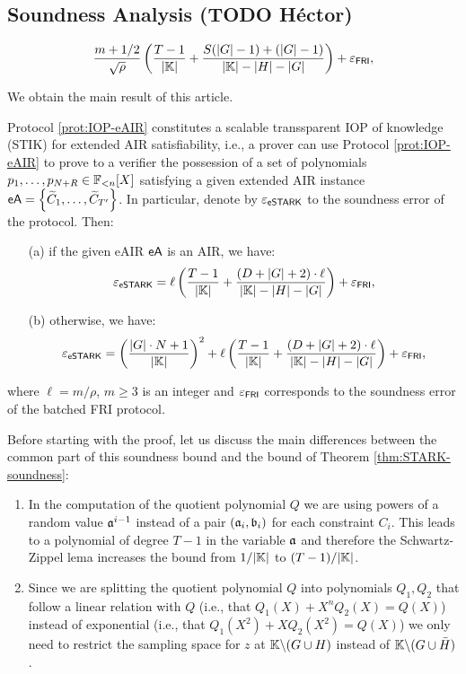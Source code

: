\ifSOUNDNESS
\subsection{Soundness Analysis (TODO Héctor)}


\[
  \frac{m+1/2}{\sqrt{\rho}} \left(\frac{T-1}{|\mathbb{K}|} + \frac{S(|G|-1)+(|G|-1)}{|\mathbb{K}|-|H|-|G|}\right) + \varepsilon_{\textsf{FRI}},
\]

We obtain the main result of this article.
\begin{theorem}\label{thm:STIK}
  Protocol \ref{prot:IOP-eAIR} constitutes a scalable transsparent IOP of knowledge (STIK) for extended AIR satisfiability, i.e., a prover can use Protocol \ref{prot:IOP-eAIR} to prove to a verifier the possession of a set of polynomials $p_1,\dots,p_{N+R} \in \mathbb{F}_{<n}[X]$ satisfying a given extended AIR instance $\textsf{eA} = \left\{\widetilde{C}_1,\dots,\widetilde{C}_{T'}\right\}$. In particular, denote by $\varepsilon_{\textsf{eSTARK}}$ to the soundness error of the protocol. Then:
  \begin{enumerate}
    \item[(a)] if the given eAIR $\textsf{eA}$ is an AIR, we have:
    \[
      \varepsilon_{\textsf{eSTARK}} = \ell \left(\frac{T-1}{|\mathbb{K}|} + \frac{(D + |G| + 2)\cdot \ell}{|\mathbb{K}|-|H|-|G|}\right) + \varepsilon_{\textsf{FRI}},
    \]
    \item[(b)] otherwise, we have:
    \[
      \varepsilon_{\textsf{eSTARK}} = \left(\frac{|G| \cdot N+1}{|\mathbb{K}|}\right)^2 + \ell \left(\frac{T-1}{|\mathbb{K}|} + \frac{(D + |G| + 2)\cdot \ell}{|\mathbb{K}|-|H|-|G|}\right) + \varepsilon_{\textsf{FRI}},
    \]
  \end{enumerate}
  where $\ell = m/\rho$, $m \geq 3$ is an integer and $\varepsilon_{\textsf{FRI}}$ corresponds to the soundness error of the batched FRI protocol.
\end{theorem}

Before starting with the proof, let us discuss the main differences between the common part of this soundness bound and the bound of Theorem \ref{thm:STARK-soundness}:
\begin{enumerate}
  \item In the computation of the quotient polynomial $Q$ we are using powers of a random value $\mathfrak{a}^{i-1}$ instead of a pair $(\mathfrak{a}_i,\mathfrak{b}_i)$ for each constraint $C_i$. This leads to a polynomial of degree $T-1$ in the variable $\mathfrak{a}$ and therefore the Schwartz-Zippel lema increases the bound from $1/|\mathbb{K}|$ to $(T-1)/|\mathbb{K}|$.
  \item Since we are splitting the quotient polynomial $Q$ into polynomials $Q_1,Q_2$ that follow a linear relation with $Q$ (i.e., that $Q_1(X) + X^nQ_2(X) = Q(X)$) instead of exponential (i.e., that $Q_1(X^2) + XQ_2(X^2) = Q(X)$) we only need to restrict the sampling space for $z$ at $\mathbb{K} \backslash (G \cup H)$ instead of $\mathbb{K} \backslash (G \cup \bar{H})$.
\end{enumerate}

